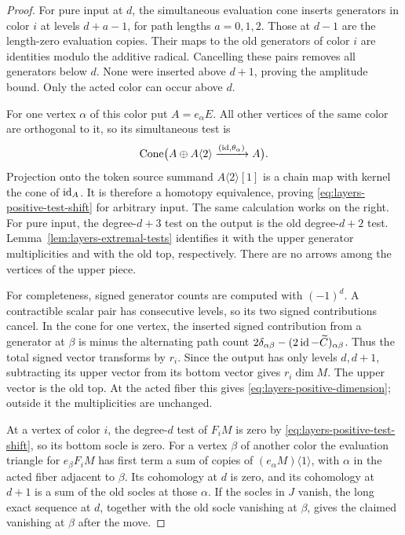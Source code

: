 \begin{proof}
For pure input at $d$, the simultaneous evaluation cone inserts
generators in color $i$ at levels $d+a-1$, for path lengths
$a=0,1,2$.  Those at $d-1$ are the length-zero evaluation copies.
Their maps to the old generators of color $i$ are identities modulo
the additive radical.  Cancelling these pairs removes all
generators below $d$.  None were inserted above $d+1$, proving the
amplitude bound.  Only the acted color can occur above $d$.

For one vertex $\alpha$ of this color put $A=e_\alpha E$.
All other vertices of the same color are orthogonal to it, so its
simultaneous test is
\begin{equation}
 \operatorname{Cone}\bigl(A\oplus A\langle2\rangle
       \xrightarrow{(\operatorname{id},\theta_\alpha)}A\bigr).
 \label{eq:layers-token-cone}
\end{equation}
Projection onto the token source summand
$A\langle2\rangle[1]$ is a chain map with kernel the cone of
$\operatorname{id}_A$.  It is therefore a homotopy equivalence, proving
\eqref{eq:layers-positive-test-shift} for arbitrary input.
The same calculation works on the right.  For pure input, the
degree-$d+3$ test on the output is the old degree-$d+2$ test.
Lemma~\ref{lem:layers-extremal-tests} identifies it with the upper
generator multiplicities and with the old top, respectively.
There are no arrows among the vertices of the upper piece.

For completeness, signed generator counts are computed with
$(-1)^d$.  A contractible scalar pair has consecutive levels, so
its two signed contributions cancel.  In the cone for one vertex,
the inserted signed contribution from a generator at $\beta$ is
minus the alternating path count
$2\delta_{\alpha\beta}-(2\operatorname{id}-\widetilde C)_{\alpha\beta}$.
Thus the total signed vector transforms by $r_i$.  Since the
output has only levels $d,d+1$, subtracting its upper vector from
its bottom vector gives $r_i\dim M$.  The upper vector is the old
top.  At the acted fiber this gives
\eqref{eq:layers-positive-dimension}; outside it the multiplicities
are unchanged.

At a vertex of color $i$, the degree-$d$ test of $F_iM$ is zero
by \eqref{eq:layers-positive-test-shift}, so its bottom socle is
zero.  For a vertex $\beta$ of another color the evaluation
triangle for $e_\beta F_iM$ has first term a sum of copies of
$(e_\alpha M)\langle1\rangle$, with $\alpha$ in the acted fiber
adjacent to $\beta$.  Its cohomology at $d$ is zero, and its
cohomology at $d+1$ is a sum of the old socles at those $\alpha$.
If the socles in $J$ vanish, the long exact sequence at $d$,
together with the old socle vanishing at $\beta$, gives the
claimed vanishing at $\beta$ after the move.
\end{proof}

